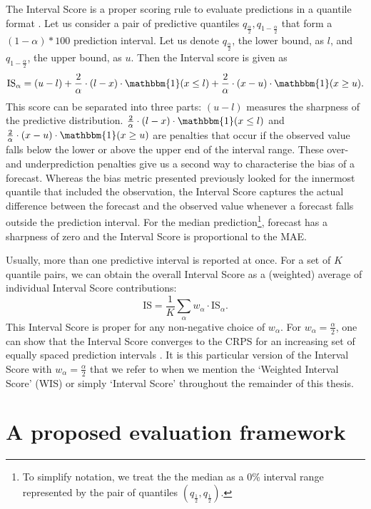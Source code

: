 \documentclass[
]{book}
\renewcommand{\mathbb}{\mathbbm}
\begin{document}
The Interval Score is a proper scoring rule to evaluate predictions in a quantile format \citep{bracherEvaluatingEpidemicForecasts2020, gneitingStrictlyProperScoring2007}. Let us consider a pair of predictive quantiles \(q_{\frac{\alpha}{2}}, q_{1-\frac{\alpha}{2}}\) that form a \((1 - \alpha) * 100\) prediction interval. Let us denote \(q_{\frac{\alpha}{2}}\), the lower bound, as \(l\), and \(q_{1-\frac{\alpha}{2}}\), the upper bound, as \(u\). Then the Interval score is given as
\[\text{IS}_{\alpha} = (u - l) + \frac{2}{\alpha} \cdot (l - x) \cdot \mathbb{1}(x \leq l) 
+ \frac{2}{\alpha} \cdot (x - u) \cdot \mathbb{1}(x \geq u).\]
This score can be separated into three parts: \((u - l)\) measures the sharpness of the predictive distribution. \(\frac{2}{\alpha} \cdot (l - x) \cdot \mathbb{1}(x \leq l)\) and \(\frac{2}{\alpha} \cdot (x - u) \cdot \mathbb{1}(x \geq u)\) are penalties that occur if the observed value falls below the lower or above the upper end of the interval range. These over- and underprediction penalties give us a second way to characterise the bias of a forecast. Whereas the bias metric presented previously looked for the innermost quantile that included the observation, the Interval Score captures the actual difference between the forecast and the observed value whenever a forecast falls outside the prediction interval. For the median prediction\footnote{To simplify notation, we treat the the median as a 0\% interval range represented by the pair of quantiles \((q_\frac{1}{2}, q_\frac{1}{2})\).}, forecast has a sharpness of zero and the Interval Score is proportional to the MAE.

Usually, more than one predictive interval is reported at once. For a set of \(K\) quantile pairs, we can obtain the overall Interval Score as a (weighted) average of individual Interval Score contributions:
\[ \text{IS} = \frac{1}{K} \sum_\alpha w_\alpha \cdot \text{IS}_\alpha.\]
This Interval Score is proper for any non-negative choice of \(w_\alpha\). For \(w_\alpha = \frac{\alpha}{2}\), one can show that the Interval Score converges to the CRPS for an increasing set of equally spaced prediction intervals \citep{bracherEvaluatingEpidemicForecasts2020}. It is this particular version of the Interval Score with \(w_\alpha = \frac{\alpha}{2}\) that we refer to when we mention the `Weighted Interval Score' (WIS) or simply `Interval Score' throughout the remainder of this thesis.

\hypertarget{a-proposed-evaluation-framework}{%
\section{A proposed evaluation framework}\label{a-proposed-evaluation-framework}}
\end{document}
